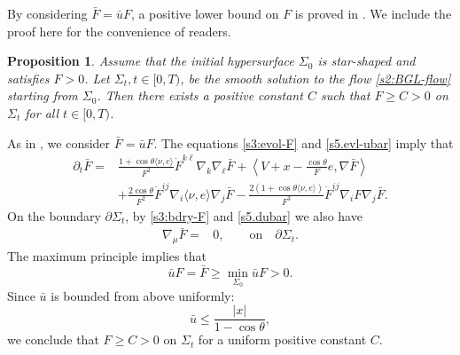\documentclass[11pt,reqno]{amsart}
\newtheorem{prop}[thm]{Proposition}
\theoremstyle{definition}
\theoremstyle{remark}
\numberwithin{equation}{section}
\renewcommand{\(}{\left(}
\renewcommand{\)}{\right)}
\renewcommand{\-}{\overline}
\renewcommand{\t}{\theta}
\begin{document}
By considering  $\bar{F}=\bar{u}F$, a positive lower bound on $F$ is proved in \cite[Prop. 2.6]{WWX23}. We include the proof here  for the convenience of readers.
\begin{prop}\label{s5.Flbd}
Assume that the initial hypersurface $\Sigma_0$ is star-shaped and satisfies $F>0$. Let $\Sigma_t, t\in [0,T)$, be the smooth solution to the flow \eqref{s2:BGL-flow} starting from $\Sigma_0$. Then there exists a positive constant $C$ such that $F\geq C>0$ on $\Sigma_t$ for all $t\in[0,T)$.
\end{prop}
\proof
As in \cite[Prop. 2.6]{WWX23}, we consider $\bar{F}=\bar{u}F$. The equations \eqref{s3:evol-F} and \eqref{s5.evl-ubar} imply that
\begin{align}\label{s5.evl-Fbar}
 \partial_t\bar{F}= & \frac{1+\cos\t\langle \nu,e\rangle}{F^2}\dot{F}^{k\ell}\nabla_k \nabla_\ell \bar{F} +\left\langle V+x-\frac{\cos\t}{F}e,\nabla \bar{F}\right\rangle\nonumber\\
   &+\frac{2\cos\theta}{F^2}\dot{F}^{ij}\nabla_i \langle \nu,e\rangle\nabla_j\bar{F}-\frac{2(1+\cos\t\langle \nu,e\rangle)}{F^3}\dot{F}^{ij}\nabla_iF\nabla_j\bar{F}.
\end{align}
On the boundary $\partial\Sigma_t$, by \eqref{s3:bdry-F} and \eqref{s5.dubar} we also have
\begin{align}\label{s5.dFbar}
  \nabla_\mu\bar{F} =&  0,\qquad \text{on}\quad \partial\Sigma_t.
\end{align}
The maximum principle implies that
\begin{equation*}
  \bar{u}F=\bar{F}\geq \min_{\Sigma_0}\bar{u}F>0.
\end{equation*}
Since $\bar{u}$ is bounded from above uniformly:
\begin{equation*}
  \bar{u}\leq \frac{|x|}{1-\cos\theta},
\end{equation*}
we conclude that $F\geq C>0$ on $\Sigma_t$ for a uniform positive constant $C$.
\endproof
\end{document}
